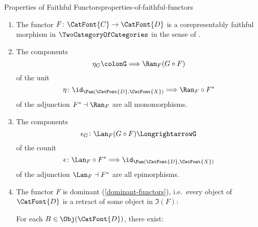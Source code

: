 \begin{proposition}{Properties of Faithful Functors}{properties-of-faithful-functors}
\begin{enumerate}
\begin{enumerate}
                    \[
                        F^{*}
                        \colon
                        \Fun(\CatFont{D},\CatFont{X})
                        \to
                        \Fun(\CatFont{C},\CatFont{X})
                    \]%
                    is monadic.
                \item\label{properties-of-faithful-functors-interaction-with-precomposition-3-d}The functor $F\colon\CatFont{C}\to\CatFont{D}$ is a corepresentably faithful morphism in $\TwoCategoryOfCategories$ in the sense of .
                \item\label{properties-of-faithful-functors-interaction-with-precomposition-3-e}The components
                    \[
                        \eta_{G}%
                        \colon%
                        G%
                        \Longrightarrow%
                        \Ran_{F}(G\circ F)%
                    \]%
                    of the unit
                    \[
                        \eta%
                        \colon%
                        \id_{\Fun(\CatFont{D},\CatFont{X})}%
                        \Longrightarrow%
                        \Ran_{F}\circ F^{*}%
                    \]%
                    of the adjunction $F^{*}\dashv\Ran_{F}$ are all monomorphisms.
                \item\label{properties-of-faithful-functors-interaction-with-precomposition-3-f}The components
                    \[
                        \epsilon_{G}%
                        \colon%
                        \Lan_{F}(G\circ F)%
                        \Longrightarrow%
                        G%
                    \]%
                    of the counit
                    \[
                        \epsilon%
                        \colon%
                        \Lan_{F}\circ F^{*}%
                        \Longrightarrow%
                        \id_{\Fun(\CatFont{D},\CatFont{X})}%
                    \]%
                    of the adjunction $\Lan_{F}\dashv F^{*}$ are all epimorphisms.
                \item\label{properties-of-faithful-functors-interaction-with-precomposition-3-g}The functor $F$ is dominant (\cref{dominant-functors}), i.e.\ every object of $\CatFont{D}$ is a retract of some object in $\Im(F)$:
                    \begin{itemize}
                        \itemstar For each $B\in\Obj(\CatFont{D})$, there exist:

\end{itemize}
\end{enumerate}
\end{enumerate}
\end{proposition}
